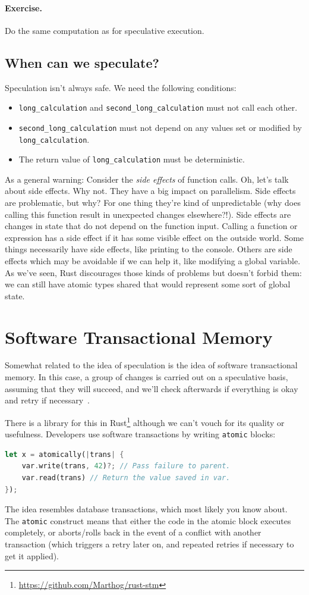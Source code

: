\paragraph{Exercise.} Do the same computation as for speculative execution.

\subsection*{When can we speculate?}
Speculation isn't always safe. We need the following conditions:
  \begin{itemize}
    \item {\tt long\_calculation} and {\tt second\_long\_calculation} must not call
      each other.
    \item {\tt second\_long\_calculation} must not depend on
      any values set or modified by {\tt long\_calculation}.
    \item The return value of {\tt long\_calculation} must be deterministic.
  \end{itemize}

As a general warning: Consider the \emph{side effects} of function calls. Oh, let's talk about side effects. Why not. They have a big impact on parallelism. Side effects are problematic, but why? For one thing they're kind of unpredictable (why does calling this function result in unexpected changes elsewhere?!). Side effects are changes in state that do not depend on the function input. Calling a function or expression has a side effect if it has some visible effect on the outside world. Some things necessarily have side effects, like printing to the console. Others are side effects which may be avoidable if we can help it, like modifying a global variable. As we've seen, Rust discourages those kinds of problems but doesn't forbid them: we can still have atomic types shared that would represent some sort of global state.


\section*{Software Transactional Memory}
Somewhat related to the idea of speculation is the idea of software transactional memory. In this case, a group of changes is carried out on a speculative basis, assuming that they will succeed, and we'll check afterwards if everything is okay and retry if necessary~\cite{stm}. 

There is a library for this in Rust\footnote{\url{https://github.com/Marthog/rust-stm}} although we can't vouch for its quality or usefulness. Developers use software transactions by writing {\tt atomic} blocks:
\begin{lstlisting}[language=Rust]
let x = atomically(|trans| {
    var.write(trans, 42)?; // Pass failure to parent.
    var.read(trans) // Return the value saved in var.
});
\end{lstlisting}
The idea resembles database transactions, which most likely you know about.
The {\tt atomic} construct means that either the code in
the atomic block executes completely, or aborts/rolls back in the
event of a conflict with another transaction (which triggers a retry
later on, and repeated retries if necessary to get it applied).

